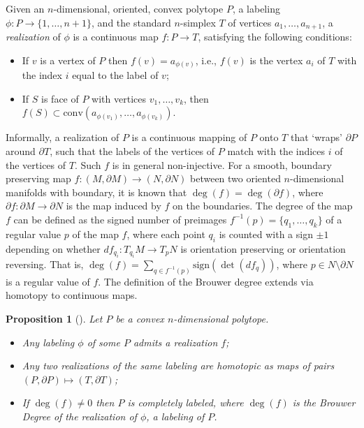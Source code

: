 \documentclass[11pt]{amsart}
\newtheorem{prop}[thm]{Proposition}
\theoremstyle{definition}
\theoremstyle{remark}
\numberwithin{equation}{section}
\theoremstyle{definition}
\begin{document}
	Given an $n$-dimensional, oriented, convex polytope  $P$, a  labeling  $\phi:P\to\{1,\ldots,n+1\}$, and the standard $n$-simplex $T$ of vertices $a_1,\ldots,a_{n+1}$, a \emph{realization} of $\phi$ is a continuous map $f: P \to T$, satisfying the following conditions:
	\begin{itemize}
		\item[(i)] If $v$ is a vertex of $P$ then $f(v)=a_{\phi(v)}$, i.e., $f(v)$ is the vertex $a_i$ of  $T$ with the index $i$ equal to the label of $v$;
		\item[(ii)] If $S$ is face of $P$  with vertices $v_1,\ldots,v_k$,  then $f(S)\subset \textrm{conv}(a_{\phi(v_1)},\ldots, a_{\phi(v_k)})$.
	\end{itemize}
	Informally, a realization of $P$ is a continuous mapping of $P$ onto $T$ that `wraps' $\partial P$ around $\partial T$, such that the labels of the vertices of $P$ match with the indices $i$ of the vertices of $T$. Such $f$ is in general non-injective. For a smooth, boundary preserving map $f:(M,\partial M)\to (N,\partial N)$ between two oriented $n$-dimensional manifolds with boundary, it is known that $\deg(f)=\deg(\partial f)$, where  $\partial f:\partial  M\to\partial N$ is the map induced by $f$ on the boundaries. The degree of the map $f$ can be defined as the signed number of preimages $f^{-1}(p)=\{q_1,\ldots,q_k\}$ of a regular value  $p$ of the map $f$, where each point $q_i$ is counted with a sign $\pm 1$ depending on whether  $df_{q_i}:T_{q_i}M\to T_{p}N$ is orientation preserving or orientation reversing. That is, $\deg(f)=\sum_{q\in f^{-1}(p)}\textrm{sign} (\det (df_{q}))$, where $p\in  N\setminus \partial N$ is a regular value of $f$. The definition of the Brouwer degree extends via homotopy to continuous maps.
	
	
	\begin{prop}[\cite{Bekker1995}]\label{prop:Bekker}  Let $P$  be a convex  $n$-dimensional polytope.
		\begin{itemize}
			\item[(i)] Any labeling $\phi$ of some $P$ admits a realization $f$;
			\item[(ii)] Any two realizations of the same labeling are homotopic as maps of pairs $(P,\partial P)\mapsto (T,\partial T)$;
			\item[(iv)] If $\deg(f)\neq 0$ then $P$ is completely labeled, where $\deg(f)$ is the Brouwer Degree of the realization of $\phi$, a labeling of $P$.
		\end{itemize}
	\end{prop}
	
\end{document}
